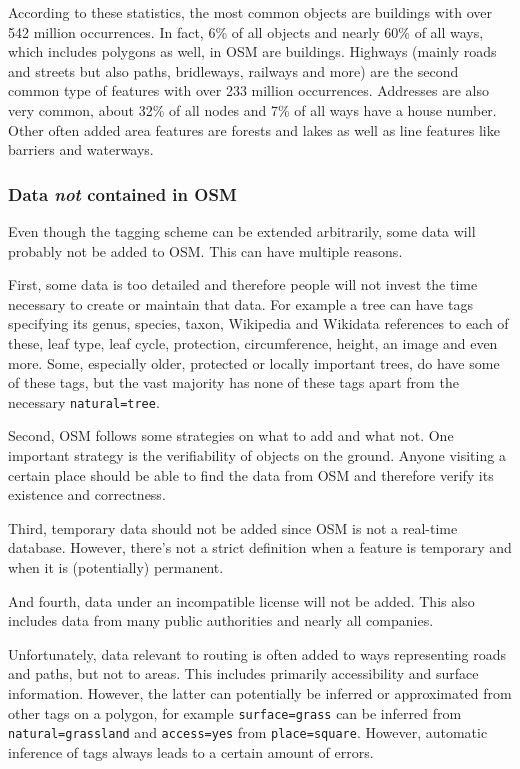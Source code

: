 			According to these statistics, the most common objects are buildings with over 542 million occurrences.
			In fact, 6\% of all objects and nearly 60\% of all ways, which includes polygons as well, in OSM are buildings.
			Highways (mainly roads and streets but also paths, bridleways, railways and more) are the second common type of features with over 233 million occurrences.
			Addresses are also very common, about 32\% of all nodes and 7\% of all ways have a house number.
			Other often added area features are forests and lakes as well as line features like barriers and waterways.
			
		\subsubsection{Data \textit{not} contained in OSM}
		
			Even though the tagging scheme can be extended arbitrarily, some data will probably not be added to OSM.
			This can have multiple reasons.
			
			First, some data is too detailed and therefore people will not invest the time necessary to create or maintain that data.
			For example a tree can have tags specifying its genus, species, taxon, Wikipedia and Wikidata references to each of these, leaf type, leaf cycle, protection, circumference, height, an image and even more. Some, especially older, protected or locally important trees, do have some of these tags, but the vast majority has none of these tags apart from the necessary \texttt{natural=tree}.
			
			Second, OSM follows some strategies on what to add and what not.
			One important strategy is the verifiability of objects on the ground.
			Anyone visiting a certain place should be able to find the data from OSM and therefore verify its existence and correctness.
			
			Third, temporary data should not be added since OSM is not a real-time database.
			However, there's not a strict definition when a feature is temporary and when it is (potentially) permanent.
			
			And fourth, data under an incompatible license will not be added.
			This also includes data from many public authorities and nearly all companies.
			
			Unfortunately, data relevant to routing is often added to ways representing roads and paths, but not to areas.
			This includes primarily accessibility and surface information.
			However, the latter can potentially be inferred or approximated from other tags on a polygon, for example \texttt{surface=grass} can be inferred from \texttt{natural=grassland} and \texttt{access=yes} from \texttt{place=square}.
			However, automatic inference of tags always leads to a certain amount of errors.
			
